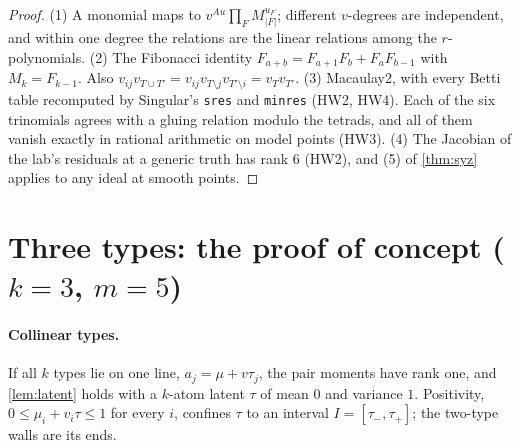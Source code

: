 \documentclass[11pt]{article}
\theoremstyle{definition}\newtheorem{definition}[theorem]{Definition}\newtheorem{remark}[theorem]{Remark}\newtheorem{example}[theorem]{Example}
\begin{document}
\begin{proof}
(1) A monomial maps to $v^{Au}\prod_FM_{|F|}^{u_F}$; different $v$-degrees are independent, and within one degree the relations are
the linear relations among the $r$-polynomials. (2) The Fibonacci identity $F_{a+b}=F_{a+1}F_b+F_aF_{b-1}$ with $M_k=F_{k-1}$. Also
$v_{ij}v_{T\cup T'}=v_{ij}v_{T\setminus j}v_{T'\setminus i}=v_Tv_{T'}$. (3) Macaulay2, with every Betti table recomputed by Singular's
\texttt{sres} and \texttt{minres} \cite{Singular} (HW2, HW4). Each of the six trinomials agrees with a gluing relation modulo the tetrads,
and all of them vanish exactly in rational arithmetic on model points (HW3). (4) The Jacobian of the lab's residuals at a generic
truth has rank $6$ (HW2), and (5) of \cref{thm:syz} applies to any ideal at smooth points.
\end{proof}

\section{Three types: the proof of concept ($k=3$, $m=5$)}\label{sec:three}
\paragraph{Collinear types.} If all $k$ types lie on one line, $a_j=\mu+v\tau_j$, the pair moments have rank one, and
\cref{lem:latent} holds with a $k$-atom latent $\tau$ of mean $0$ and variance $1$. Positivity, $0\le\mu_i+v_i\tau\le1$ for every
$i$, confines $\tau$ to an interval $I=[\tau_-,\tau_+]$; the two-type walls are its ends.
\end{document}
